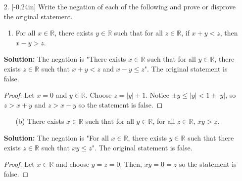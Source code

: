 \documentclass[letterpaper,12pt]{article}
\theoremstyle{definition}
\begin{document}
\pagebreak
\begin{enumerate}
    \item[2.] \reversemarginpar{}[-0.24in] Write the negation of each of the following and prove or disprove the original statement.
    \begin{enumerate}
        \item For all $x \in \mathbb{R}$, there exists $y \in \mathbb{R}$ such that for all $z \in \mathbb{R}$, if $x + y < z$, then $x -y > z$.
    \end{enumerate}
     \begin{mdframed}
            \textbf{Solution:} The negation is "There exists $x \in \mathbb{R}$ such that for all $y \in \mathbb{R}$, there exists $z \in \mathbb{R}$ such that $x+y < z$ and $x-y \leq z$". The original statement is false. \renewcommand{\proofname}{Disproof} \begin{proof}
                Let $x = 0$ and $y \in \mathbb{R}$. Choose $z = |y| + 1$. Notice $\pm y \leq |y| <  1 + |y|$, so $z > x+y$ and $z > x-y$ so the statement is false. 
            \end{proof}
        \end{mdframed}
\end{enumerate}
\pagebreak
\begin{enumerate}
    \item[] \begin{enumerate}
        \item[(b)] There exists $x \in \mathbb{R}$ such that for all $y \in \mathbb{R}$, for all $z \in \mathbb{R}$, $xy > z$.
        
    \end{enumerate}
     \begin{mdframed}
            \textbf{Solution:} The negation is "For all $x \in \mathbb{R}$, there exists $y \in \mathbb{R}$ such that there exists $z \in \mathbb{R}$ such that $xy \leq z$". The original statement is false. \renewcommand{\proofname}{Disproof} \begin{proof}
                Let $x \in \mathbb{R}$ and choose $y = z = 0$. Then, $xy = 0 = z$ so the statement is false. 
            \end{proof}
        \end{mdframed}
\end{enumerate}
\pagebreak
\end{document}
